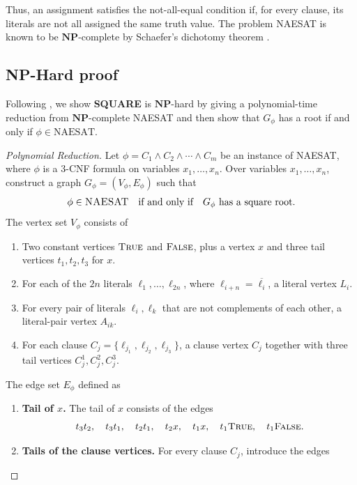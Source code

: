 \documentclass[11pt]{report}
\begin{document}
Thus, an assignment satisfies the not-all-equal condition if, for every clause, its literals are not all assigned the same truth value. The problem NAESAT is known to be $\mathbf{NP}$-complete by Schaefer's dichotomy theorem \cite{schaefer_1978_complexity}. 

\subsection{NP-Hard proof} \label{subsec::np_hard_proof}

Following \cite{motwani_sudan_1994_roots}, we show \textbf{SQUARE} is $\mathbf{NP}$-hard by giving a polynomial-time reduction from $\mathbf{NP}$-complete NAESAT and then show that $G_\phi$ has a root if and only if $\phi \in \mathrm{NAESAT}$. 

\begin{proof}[Polynomial Reduction] \label{proof::polynomial_reduction}
  Let $\phi = C_1 \land C_2 \land \cdots \land C_m $ be an instance of NAESAT, where $\phi$ is a $3$-CNF formula on variables $x_1, \ldots, x_n$. Over variables $x_1, \dots, x_n$, construct a graph $G_\phi = (V_\phi,E_\phi)$ such that
  \[
  \phi \in \textsc{NAESAT} \quad \text{if and only if} \quad G_\phi \text{ has a square root}.
  \]
  The vertex set $V_\phi$ consists of
  \begin{enumerate}[label=(\roman*)]
    \item Two constant vertices $\textsc{True}$ and $\textsc{False}$, plus a vertex $x$ and three tail vertices $t_1, t_2, t_3$ for $x$.
    \item For each of the $2n$ literals $\ell_1, \dots, \ell_{2n}$, where $\ell_{i+n} = \overline{\ell_i}$, a literal vertex $L_i$. 
    \item For every pair of literals $\ell_i,\ell_k$ that are not complements of each other, a literal-pair vertex $A_{ik}$.
    \item For each clause $C_j=\{\ell_{j_1},\ell_{j_2},\ell_{j_3}\}$, a clause vertex $C_j$ together with three tail vertices $C_j^1,C_j^2,C_j^3$.
  \end{enumerate}
  \noindent The edge set $E_\phi$ defined as
  \begin{enumerate}[label=\roman*)]
    \item \textbf{Tail of $x$.} The tail of $x$ consists of the edges
    \[
    t_3t_2,\quad t_3t_1,\quad t_2t_1,\quad t_2x,\quad t_1x,\quad t_1\text{$\textsc{True}$},\quad t_1\text{$\textsc{False}$}.
    \]
    \item \textbf{Tails of the clause vertices.} For every clause $C_j$, introduce the edges

\end{enumerate}
\end{proof}
\end{document}

